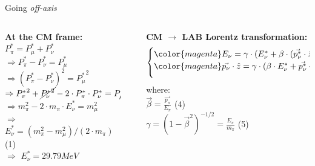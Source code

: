 {\begin{frame}{Going {\em off-axis}}
\begin{columns}
  \begin{column}{0.44\textwidth}
   \begin{block}{}
    {\color{red} \bf At the CM frame:}\\
    \vspace{0.3cm}
    {\small
     $P^{*}_{\pi} = P^{*}_{\mu} + P^{*}_{\nu}$\\
     $\Rightarrow P^{*}_{\pi} - P^{*}_{\nu} = P^{*}_{\mu}$\\
     $\Rightarrow (P^{*}_{\pi} - P^{*}_{\nu})^{2} = {P^{*}_{\mu}}^{2}$\\
     $\Rightarrow {P^{*}_{\pi}}^{2} + \cancel{{P^{*}_{\nu}}^{2}} - 2 \cdot P^{*}_{\pi} \cdot P^{*}_{\nu} = {P^{*}_{\mu}}^{2}$\\
     $\Rightarrow m_{\pi}^{2} - 2 \cdot m_{\pi} \cdot E_{\nu}^{*} = m_{\mu}^{2}$\\
     $\Rightarrow$ {\color{red} $E_{\nu}^{*} = (m_{\pi}^{2} - m_{\mu}^{2}) / (2 \cdot m_{\pi}) \ \ $} (1)\\
     $\Rightarrow$ {\color{red} \bf $E_{\nu}^{*} = 29.79 MeV$}
    }
   \end{block}
  \end{column}
  \begin{column}{0.02\textwidth}
  \end{column}
  \begin{column}{0.54\textwidth}
   {\color{red} \bf CM $\rightarrow$ LAB Lorentz transformation:}
   \begin{equation*}
     \begin{cases}
        {\color{magenta} E_{\nu} = \gamma \cdot (E_{\nu}^{*} + \beta \cdot (\vec{p_{\nu}^{*}}\cdot \hat{z}))} \ \ (2)\\
        \vspace{0.2cm}
        {\color{magenta} \vec{p_{\nu}}\cdot \hat{z} = \gamma \cdot (\beta \cdot E_{\nu}^{*} + \vec{p_{\nu}^{*}}\cdot \hat{z})} \ \ (3)
     \end{cases}
    \end{equation*}
    where:\\
      \vspace{0.1cm}
      \hspace{0.3cm} {\color{blue} $\vec{\beta} = \frac{\vec{p_{\pi}}}{E_{\pi}}$}  (4)\\
      \hspace{0.3cm} {\color{blue} $\gamma = (1-\vec{\beta}^{2})^{-1/2} = \frac{E_{\pi}}{m_{\pi}}$}  (5)\\
  \end{column}
\end{columns}


\end{frame}}
